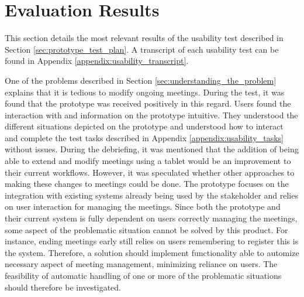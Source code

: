\section{Evaluation Results}\label{sec:usability_evaluation_results}
This section details the most relevant results of the usability test described in Section \ref{sec:prototype_test_plan}.
A transcript of each usability test can be found in Appendix \ref{appendix:usability_transcript}.

One of the problems described in Section \ref{sec:understanding_the_problem} explains that it is tedious to modify ongoing meetings. 
During the test, it was found that the prototype was received positively in this regard. 
Users found the interaction with and information on the prototype intuitive. 
They understood the different situations depicted on the prototype and understood how to interact and complete the test tasks described in Appendix \ref{appendix:usability_tasks} without issues.
During the debriefing, it was mentioned that the addition of being able to extend and modify meetings using a tablet would be an improvement to their current workflows.
However, it was speculated whether other approaches to making these changes to meetings could be done. 
The prototype focuses on the integration with existing systems already being used by the stakeholder and relies on user interaction for managing the meetings.
Since both the prototype and their current system is fully dependent on users correctly managing the meetings, some aspect of the problematic situation cannot be solved by this product. 
For instance, ending meetings early still relies on users remembering to register this is the system. 
Therefore, a solution should implement functionality able to automize necessary aspect of meeting management, minimizing reliance on users.
The feasibility of  automatic handling of one or more of the problematic situations should therefore be investigated.
